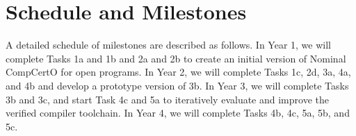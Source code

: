 \section{Schedule and Milestones}

A detailed schedule of milestones are described as follows. In Year 1, 
we will complete Tasks 1a and 1b and 2a and 2b to 
create an initial version of Nominal CompCertO for open programs.
In Year 2, we will complete Tasks 1c, 2d, 3a, 4a, and 4b and
develop a prototype version of 3b. In Year 3, 
we will complete Tasks 3b and 3c, and start Task 4c and 5a to
iteratively evaluate and improve the verified compiler toolchain.
In Year 4, we will complete Tasks 4b, 4c, 5a, 5b, and 5c.


